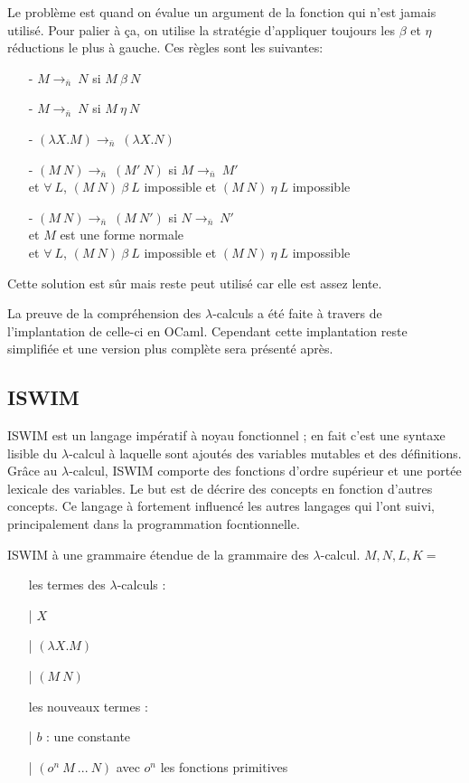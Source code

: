 \documentclass[10pt,a4paper]{article}
\begin{document}
			Le problème est quand on évalue un argument de la fonction qui n'est jamais utilisé. Pour palier à ça, on utilise la stratégie d'appliquer toujours les $\beta$ et $\eta$ réductions le plus à gauche. Ces règles sont les suivantes:
			\begin{itemize}
				\item[-] $M \longrightarrow_{\bar{n}}~N$ si $M~\beta~N$
				\item[-] $M \longrightarrow_{\bar{n}}~N$ si $M~\eta~N$
				\item[-] $(\lambda X.M) \longrightarrow_{\bar{n}}~(\lambda X.N)$
				\item[-] $(M~N) \longrightarrow_{\bar{n}}~(M'~N)$ si $M \longrightarrow_{\bar{n}}~M'$
				\\ et $\forall~L$, $(M~N)~\beta~L$ impossible et $(M~N)~\eta~L$ impossible
				\item[-] $(M~N) \longrightarrow_{\bar{n}}~(M~N')$ si $N \longrightarrow_{\bar{n}}~N'$
				\\ et $M$ est une forme normale
				\\ et  $\forall~L$, $(M~N)~\beta~L$ impossible et $(M~N)~\eta~L$ impossible
			\end{itemize}
			\smallbreak
			Cette solution est sûr mais reste peut utilisé car elle est assez lente. 
			\medbreak
			
			La preuve de la compréhension des $\lambda$-calculs a été faite à travers de l'implantation de celle-ci en OCaml. Cependant cette implantation reste simplifiée et une version plus complète sera présenté après. 
			
		\subsection{ISWIM}	
			
			ISWIM est un langage impératif à noyau fonctionnel ; en fait c'est une syntaxe lisible du $\lambda$-calcul à laquelle sont ajoutés des variables mutables et des définitions. Grâce au $\lambda$-calcul, ISWIM comporte des fonctions d'ordre supérieur et une portée lexicale des variables. Le but est de décrire des concepts en fonction d'autres concepts. Ce langage à fortement influencé les autres langages qui l'ont suivi, principalement dans la programmation focntionnelle.
			\medbreak
			 
			ISWIM à une grammaire étendue de la grammaire des $\lambda$-calcul.
			\smallbreak
			$M,N,L,K =$
			\begin{itemize}
				\item[ ] les termes des $\lambda$-calculs :
				\item[|] $X$ 
				\item[|] $(\lambda X.M)$
				\item[|] $(M~N)$
				\item[ ] les nouveaux termes :
				\item[|] $b$ : une constante
				\item[|] $(o^{n}~M~...~N)$ avec $o^{n}$ les fonctions primitives
			\end{itemize}
			\medbreak
			
\end{document}
